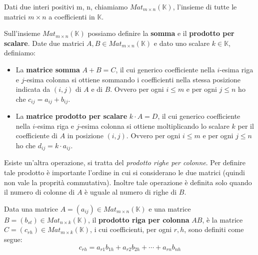 \begin{defn}
	Dati due interi positivi m, n, chiamiamo
	$Mat_{m \times n} (\mathbb{K})$, l'insieme di tutte le matrici
	$m \times n$ a coefficienti in $\mathbb{K}$.
\end{defn}

\begin{defn}
	Sull'insieme $Mat_{m \times n} (\mathbb{K})$ possiamo definire la
	\textbf{somma} e il \textbf{prodotto per scalare}. Date due matrici
	$A, B \in Mat_{m \times n} (\mathbb{K})$ e dato uno scalare
	$k \in \mathbb{K}$, definiamo:
	\begin{itemize}
		\item
		      La \textbf{matrice somma} $A + B = C$, il cui generico coefficiente nella
		      $i$-esima riga e $j$-esima colonna si ottiene sommando i
		      coefficienti nella stessa posizione indicata da $(i, j)$ di $A$ e
		      di $B$. Ovvero per ogni $i \leq m$ e per ogni $j \leq n$
		      ho che $c_{ij} = a_{ij} + b_{ij}$.
		\item
		      La \textbf{matrice prodotto per scalare} $k \cdot A = D$, il cui
		      generico coefficiente nella $i$-esima riga e $j$-esima
		      colonna si ottiene moltiplicando lo scalare $k$ per il
		      coefficiente di $A$ in posizione $(i, j)$. Ovvero per ogni
		      $i \leq m$ e per ogni $j \leq n$ ho che
		      $d_{ij} = k \cdot a_{ij}$.
	\end{itemize}
\end{defn}

Esiste un'altra operazione, si tratta del
\emph{prodotto righe per colonne}. Per definire tale prodotto \`e
importante l'ordine in cui si considerano le due matrici (quindi non vale la
proprit\`a commutativa). Inoltre tale operazione \`e definita solo quando il
numero di colonne di $A$ \`e uguale al numero di righe di $B$.

\begin{defn}
	Data una matrice $A = (a_{ij}) \in Mat_{m \times n} (\mathbb{K})$ e una
	matrice $B = (b_{st}) \in Mat_{n \times k} (\mathbb{K})$, il
	\textbf{prodotto riga per colonna} $AB$, \`e la matrice
	$C = (c_{rh}) \in Mat_{m \times k} (\mathbb{K})$, i cui coefficienti,
	per ogni $r, h$, sono definiti come segue:
	\begin{equation*}
		c_{rh} = a_{r1} b_{1h} + a_{r2} b_{2h} + \cdots + a_{rn} b_{nh}
	\end{equation*}
\end{defn}


